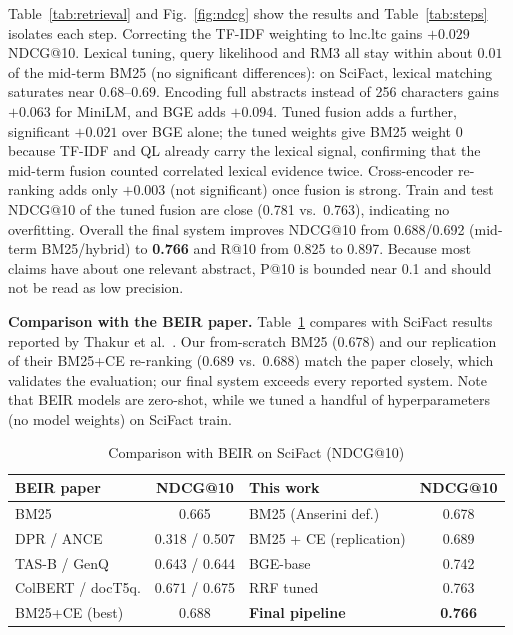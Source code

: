 \documentclass[conference]{IEEEtran}
\begin{document}
Table~\ref{tab:retrieval} and Fig.~\ref{fig:ndcg} show the results and Table~\ref{tab:steps} isolates each step. Correcting
the TF-IDF weighting to lnc.ltc gains $+0.029$ NDCG@10. Lexical tuning, query likelihood and RM3 all stay within about
$0.01$ of the mid-term BM25 (no significant differences): on SciFact, lexical matching saturates near $0.68$--$0.69$.
Encoding full abstracts instead of 256 characters gains $+0.063$ for MiniLM, and BGE adds $+0.094$. Tuned fusion adds a
further, significant $+0.021$ over BGE alone; the tuned weights give BM25 weight 0 because TF-IDF and QL already carry the
lexical signal, confirming that the mid-term fusion counted correlated lexical evidence twice. Cross-encoder re-ranking
adds only $+0.003$ (not significant) once fusion is strong. Train and test NDCG@10 of the tuned fusion are close (0.781
vs.\ 0.763), indicating no overfitting. Overall the final system improves NDCG@10 from 0.688/0.692 (mid-term BM25/hybrid)
to \textbf{0.766} and R@10 from 0.825 to 0.897. Because most claims have about one relevant abstract, P@10 is bounded near
0.1 and should not be read as low precision.

\textbf{Comparison with the BEIR paper.} Table~\ref{tab:beir} compares with SciFact results reported by Thakur et
al.\ \cite{thakur2021beir}. Our from-scratch BM25 (0.678) and our replication of their BM25+CE re-ranking (0.689 vs.\ 0.688)
match the paper closely, which validates the evaluation; our final system exceeds every reported system. Note that BEIR
models are zero-shot, while we tuned a handful of hyperparameters (no model weights) on SciFact train.

\begin{table}[t]
\centering
\caption{Comparison with BEIR \cite{thakur2021beir} on SciFact (NDCG@10)}
\label{tab:beir}
\footnotesize
\setlength{\tabcolsep}{2.5pt}
\begin{tabular}{@{}lc|lc@{}}
\toprule
BEIR paper & NDCG@10 & This work & NDCG@10 \\
\midrule
BM25 & 0.665 & BM25 (Anserini def.) & 0.678 \\
DPR / ANCE & 0.318 / 0.507 & BM25 + CE (replication) & 0.689 \\
TAS-B / GenQ & 0.643 / 0.644 & BGE-base & 0.742 \\
ColBERT / docT5q. & 0.671 / 0.675 & RRF tuned & 0.763 \\
BM25+CE (best) & 0.688 & \textbf{Final pipeline} & \textbf{0.766} \\
\bottomrule
\end{tabular}
\end{table}
\end{document}
